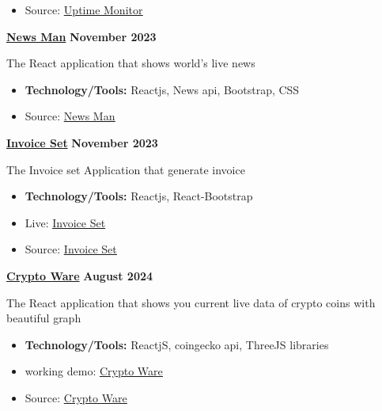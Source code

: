 \documentclass[letterpaper, 8pt]{article}
\newcommand{\bulletSpace}{\vspace{-8pt}}
\newcommand{\secEndSpace}{\vspace{4pt}}
\newcommand{\spaceCollapse}{\vspace{-5pt}}
\begin{document}
\begin{addmargin}[1em]{1em}
\begin{itemize}
		      \bulletSpace
        
		\item Source: \href{https://github.com/sukhlotey/Uptime-monitor}{\underline{Uptime Monitor}}
	\end{itemize}
	\noindent\href{https://github.com/sukhlotey/newsdaily}{\textbf{News Man}}  \hfill \textbf{November 2023} 
		
	\noindent The React application that shows world's live news
	\spaceCollapse
	\begin{itemize}
		\item \textbf{Technology/Tools:} Reactjs, News api, Bootstrap, CSS
		      \bulletSpace
        
		\item Source: \href{https://github.com/sukhlotey/newsdaily}{\underline{News Man}}
	\end{itemize}
 \noindent\href{https://github.com/sukhlotey/invoice-set}{\textbf{Invoice Set}}  \hfill \textbf{November 2023} 
		
	\noindent The Invoice set Application that generate invoice
	\spaceCollapse
	\begin{itemize}
		\item \textbf{Technology/Tools:} Reactjs, React-Bootstrap
		      \bulletSpace
            	\item Live: \href{https://invoiceset.netlify.app/}
  {\underline{Invoice Set}}
		\item Source: \href{https://github.com/sukhlotey/invoice-set}
  {\underline{Invoice Set}}
	\end{itemize}
	
	\noindent\href{https://github.com/sukhlotey/Crypto-Ware}{\textbf{Crypto Ware}}  \hfill \textbf{August 2024} 
		
	\noindent The React application that shows you current live data of crypto coins with beautiful graph
	\spaceCollapse
	\begin{itemize}
		\item \textbf{Technology/Tools:} ReactjS, coingecko api, ThreeJS libraries
		      \bulletSpace
		\item working demo: \href{https://cryptowarehouse.netlify.app/}{\underline{Crypto Ware}}
           \item Source: \href{https://github.com/sukhlotey/Crypto-Ware}{\underline{Crypto Ware}}
	\end{itemize}

		
\end{addmargin}
\secEndSpace
\end{document}
